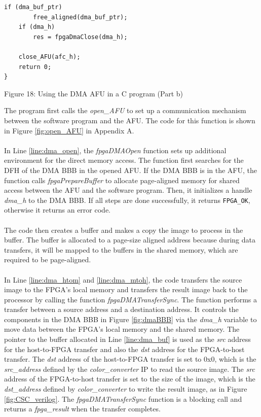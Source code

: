 \documentclass[11pt, twoside, pdftex]{article}
\begin{document}
\lstset{language=C,numbers=left}
\begin{center}
\begin{minipage}[h]{17 cm}
\begin{lstlisting}[name=DMA_code]
	if (dma_buf_ptr)
		free_aligned(dma_buf_ptr);
	if (dma_h)
		res = fpgaDmaClose(dma_h);

	close_AFU(afc_h);
	return 0;
}
\end{lstlisting}
\begin{center}
Figure 18: Using the DMA AFU in a C program (Part b)
\end{center}
\end{minipage}
\end{center}
 The program first calls the \emph{open\_AFU} to set up a communication mechanism between the software program and the AFU. The code for this function is shown in Figure \ref{fig:open_AFU} in Appendix A. \\
 \\
 In Line \ref{line:dma_open}, the \emph{fpgaDMAOpen} function sets up additional environment for the direct memory access. The function first searches for the DFH of the DMA BBB in the opened AFU. If the DMA BBB is in the AFU, the function calls \emph{fpgaPrepareBuffer} to allocate page-aligned memory for shared access between the AFU and the software program. Then, it initializes a handle \emph{dma\_h} to the DMA BBB. If all steps are done successfully, it returns \texttt{FPGA\_OK}, otherwise it returns an error code. \\
 \\
The code then creates a buffer and makes a copy the image to process in the buffer. The buffer is allocated to a page-size aligned address because during data transfers, it will be mapped to the buffers in the shared memory, which are required to be page-aligned.\\
 \\
 In Line \ref{line:dma_htom} and \ref{line:dma_mtoh}, the code transfers the source image to the FPGA's local memory and transfers the result image back to the processor by calling the function \emph{fpgaDMATransferSync}. The function performs a transfer between a source address and a destination address. It controls the components in the DMA BBB in Figure \ref{fig:dmaBBB} via the \emph{dma\_h} variable to move data between the FPGA's local memory and the shared memory. The pointer to the buffer allocated in Line \ref{line:dma_buf} is used as the \emph{src} address for the host-to-FPGA transfer and also the \emph{dst} address for the FPGA-to-host transfer. The \emph{dst} address of the host-to-FPGA transfer is set to 0x0, which is the \emph{src\_address} defined by the \emph{color\_converter} IP to read the source image. The \emph{src} address of the FPGA-to-host transfer is set to the size of the image, which is the \emph{dst\_address} defined by \emph{color\_converter} to write the result image, as in Figure \ref{fig:CSC_verilog}. The \emph{fpgaDMATransferSync} function is a blocking call and returns a \emph{fpga\_result} when the transfer completes. \\
\end{document}
